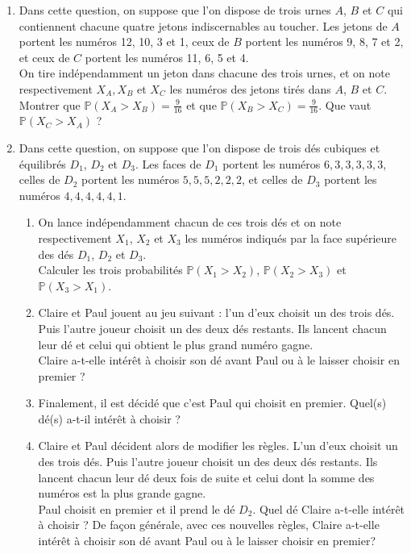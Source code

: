 \documentclass[landscape,twocolumn,leqno,a4paper,10pt]{report} %
\newcommand{\Prob}{\mathbb{P}}
\begin{document}
\begin{enumerate}
	\item Dans cette question, on suppose que l'on dispose de trois urnes $A$, $B$ et $C$ qui contiennent chacune quatre jetons indiscernables au toucher. Les jetons de $A$ portent les numéros 12, 10, 3 et 1, ceux de $B$ portent les numéros 9, 8, 7 et 2, et ceux de $C$ portent les numéros 11, 6, 5 et 4.\\
	On tire indépendamment un jeton dans chacune des trois urnes, et on note respectivement $X_{A}, X_{B}$ et $X_{C}$ les numéros des jetons tirés dans $A$, $B$ et $C$.\\
	Montrer que $\Prob\left(X_{A}>X_{B}\right)=\frac{9}{16}$ et que $\Prob\left(X_{B}>X_{C}\right)=\frac{9}{16}$. Que vaut $\Prob\left(X_{C}>X_{A}\right)$ ?
	\item Dans cette question, on suppose que l'on dispose de trois dés cubiques et équilibrés $D_{1}$, $D_{2}$ et $D_{3}$. Les faces de $D_{1}$ portent les numéros $6,3,3,3,3,3$, celles de $D_{2}$ portent les numéros $5,5,5,2,2,2$, et celles de $D_{3}$ portent les numéros $4,4,4,4,4,1$.
	\begin{enumerate}
		\item On lance indépendamment chacun de ces trois dés et on note respectivement $X_{1}$, $X_{2}$ et $X_{3}$ les numéros indiqués par la face supérieure des dés $D_{1}$, $D_{2}$ et $D_{3}$.\\
		Calculer les trois probabilités $\Prob\left(X_{1}>X_{2}\right)$, $\Prob\left(X_{2}>X_{3}\right)$ et $\Prob\left(X_{3}>X_{1}\right)$.
		\item Claire et Paul jouent au jeu suivant : l'un d'eux choisit un des trois dés. Puis l'autre joueur choisit un des deux dés restants. Ils lancent chacun leur dé et celui qui obtient le plus grand numéro gagne.\\
		Claire a-t-elle intérêt à choisir son dé avant Paul ou à le laisser choisir en premier ?
		\item Finalement, il est décidé que c'est Paul qui choisit en premier. Quel(s) dé(s) a-t-il intérêt à choisir ?
		\item Claire et Paul décident alors de modifier les règles. L'un d'eux choisit un des trois dés. Puis l'autre joueur choisit un des deux dés restants. Ils lancent chacun leur dé deux fois de suite et celui dont la somme des numéros est la plus grande gagne.\\
		Paul choisit en premier et il prend le dé $D_{2}$. Quel dé Claire a-t-elle intérêt à choisir ?
		De façon générale, avec ces nouvelles règles, Claire a-t-elle intérêt à choisir son dé avant Paul ou à le laisser choisir en premier?
	\end{enumerate}
\end{enumerate}
\end{document}

